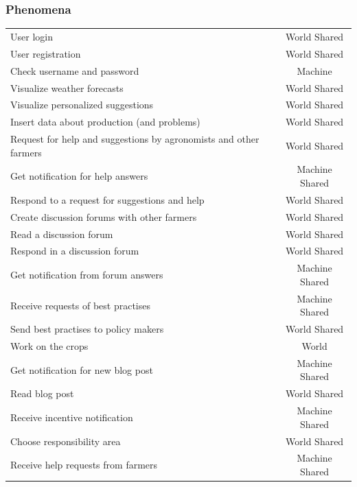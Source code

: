 \documentclass{article}
\begin{document}
\newpage

\subsubsection{Phenomena}

    \begin{table}[h]
        \centering
        \begin{tabular}{l|c}
        \hline
            User login & World Shared \\
            User registration & World Shared \\
            Check username and password & Machine \\
        \hline
            Visualize weather forecasts & World Shared \\
            Visualize personalized suggestions & World Shared \\
            Insert data about production (and problems) & World Shared \\
            Request for help and suggestions by agronomists and other farmers & World Shared\\
            Get notification for help answers & Machine Shared \\
            Respond to a request for suggestions and help & World Shared\\
            Create discussion forums with other farmers & World Shared\\
            Read a discussion forum & World Shared\\
            Respond in a discussion forum & World Shared\\
            Get notification from forum answers & Machine Shared\\
            Receive requests of best practises & Machine Shared\\
            Send best practises to policy makers & World Shared\\
            Work on the crops & World \\
            Get notification for new blog post & Machine Shared \\
            Read blog post & World Shared \\
            Receive incentive notification & Machine Shared \\
        \hline
            Choose responsibility area & World Shared \\
            Receive help requests from farmers & Machine Shared \\

\end{tabular}
\end{table}
\end{document}
